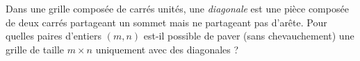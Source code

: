 Dans une grille composée de carrés unités, une \textit{diagonale} est une pièce composée de deux carrés partageant un sommet mais ne partageant pas d'arête. Pour quelles paires d'entiers $(m, n)$ est-il possible de paver (sans chevauchement) une grille de taille $m\times n$ uniquement avec des diagonales ?